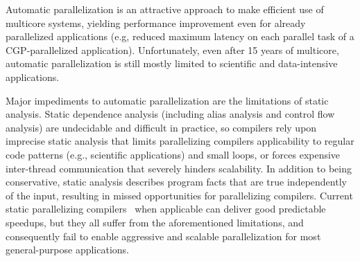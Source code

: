 %

Automatic parallelization is an attractive approach to make efficient use of
multicore systems, yielding performance improvement even for already parallelized
applications (e.g, reduced maximum latency on each parallel task of a
CGP-parallelized application). Unfortunately, even after 15 years of multicore,
automatic parallelization is still mostly limited to scientific and
data-intensive applications.

Major impediments to automatic parallelization are the limitations of static
analysis. Static dependence analysis (including alias analysis and control flow
analysis) are undecidable and difficult in practice, so compilers rely upon
imprecise static analysis that limits parallelizing compilers applicability to
regular code patterns (e.g., scientific applications) and small loops, or forces
expensive inter-thread communication that severely hinders scalability.
%
In addition to being conservative, static analysis describes program facts that
are true independently of the input, resulting in missed opportunities for
parallelizing compilers.
Current static parallelizing compilers~\cite{campanoni:2012:iscgo,
raman:2008:iscgo, suif:94:stanford}
when applicable can deliver good
predictable speedups, but they all suffer from the aforementioned
limitations, and consequently fail to enable aggressive and scalable
parallelization for most general-purpose applications.

